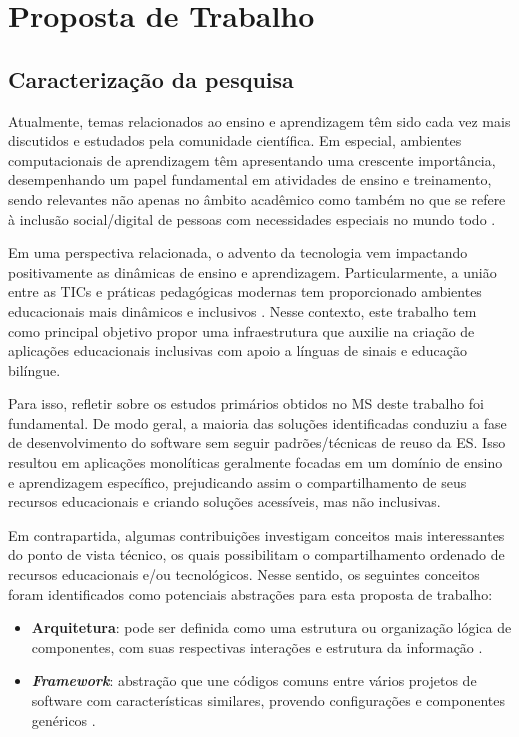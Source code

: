 \chapter{Proposta de Trabalho}
\label{chapter:proposta}

\section{Caracterização da pesquisa}

Atualmente, temas relacionados ao ensino e aprendizagem têm sido cada vez mais discutidos e estudados pela comunidade científica. Em especial, ambientes computacionais de aprendizagem têm apresentando uma crescente importância, desempenhando um papel fundamental em atividades de ensino e treinamento, sendo relevantes não apenas no âmbito acadêmico como também no que se refere à inclusão social/digital de pessoas com necessidades especiais no mundo todo \cite{Svetlana2009,Bersch2017,Cilli2017}.

Em uma perspectiva relacionada, o advento da tecnologia vem impactando positivamente as dinâmicas de ensino e aprendizagem. Particularmente, a união entre as TICs e práticas pedagógicas modernas tem proporcionado ambientes educacionais mais dinâmicos e inclusivos \cite{Cilli2017}. Nesse contexto, este trabalho tem como principal objetivo propor uma infraestrutura que auxilie na criação de aplicações educacionais inclusivas com apoio a línguas de sinais e educação bilíngue.

Para isso, refletir sobre os estudos primários obtidos no MS deste trabalho foi fundamental. De modo geral, a maioria das soluções identificadas conduziu a fase de desenvolvimento do software sem seguir padrões/técnicas de reuso da ES. Isso resultou em aplicações monolíticas geralmente focadas em um domínio de ensino e aprendizagem específico, prejudicando assim o compartilhamento de seus recursos educacionais e criando soluções acessíveis, mas não inclusivas.

Em contrapartida, algumas contribuições investigam conceitos mais interessantes do ponto de vista técnico, os quais possibilitam o compartilhamento ordenado de recursos educacionais e/ou tecnológicos. Nesse sentido, os seguintes conceitos foram identificados como potenciais abstrações para esta proposta de trabalho:

\begin{itemize}
    \item \textbf{Arquitetura}: pode ser definida como uma estrutura ou organização lógica de componentes, com suas respectivas interações e estrutura da informação \cite{Pressman2016}. %
    \item \textbf{\textit{Framework}}: abstração que une códigos comuns entre vários projetos de software com características similares, provendo configurações e componentes genéricos \cite{Sommerville2015}.
\end{itemize}

